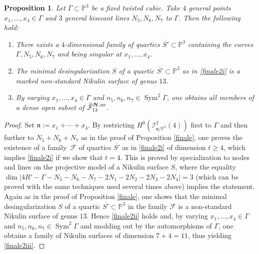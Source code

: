 \documentclass[11pt]{article}
\newcommand{\ns}{{\mkern1mu\mathrm{ns}}}
\newcommand{\bN}{\boldsymbol{N}}
\theoremstyle{plain}
\newtheorem{prop}[thm]{Proposition}
\theoremstyle{definition}
\DeclareMathOperator{\Sym}{Sym}
\newcommand\PP{{\mathbb P}}
\newcommand\F{{\mathcal F}}
\begin{document}
\begin{prop}\label{finale2}
Let $\Gamma\subset \PP^3$ be a fixed twisted cubic. Take $4$ general points $x_1,\ldots,x_4\in \Gamma$ and $3$ general bisecant lines $N_5,N_6,N_7$ to $\Gamma$. Then the following hold:
\begin{enumerate}
\item\label{finale2i}
There exists a $4$-dimensional family of quartics $\overline{S'}\subset\mathbb P^3$ containing the curves \linebreak $\Gamma,N_5,N_6,N_7$ and being singular at $x_1,\ldots,x_4$.
\item\label{finale2ii}
The minimal desingularization $S$ of a quartic $\overline{S'}\subset\mathbb P^3$ as in \eqref{finale2i} is a marked non-standard Nikulin surface of genus $13$.
\item\label{finale2iii}
By varying $x_1,\ldots,x_4\in \Gamma$ and $n_5, n_6,n_7\in \Sym^2\Gamma$, one obtains all members of a dense open subset of $\widehat{\F}_{13}^{\bN,\ns}$.
\end{enumerate}
\end{prop}

\begin{proof}
Set $\mathfrak n:=x_1+\cdots+x_4$. By restricting $H^0(\mathcal I^2_{\mathfrak{n}/\PP^3}(4))$ first to $\Gamma$ and then further to $N_5+N_6+N_7$ as in the proof of Proposition \ref{finale}, one proves the existence of a family~$\F$ of quartics $\overline{S'}$ as in \eqref{finale2i} of dimension $t\geq 4$, which implies \eqref{finale2i} if we show that $t=4$. This is proved by specialization to nodes and lines on the projective model of a Nikulin surface $S$, where the equality
$
\dim |4R'-\Gamma-N_5-N_6-N_7-2N_1-2N_2-2N_3-2N_4|=3
$
(which can be proved with the same techniques used several times above) implies the statement.
Again as in the proof of Proposition \ref{finale}, one shows that the minimal desingularization $S$ of a quartic $\overline{S'}\subset\mathbb P^3$ in the family $\F$ is a non-standard Nikulin surface of genus $13$. Hence \eqref{finale2ii} holds and, by varying $x_1,\ldots,x_4\in \Gamma$ and $n_5, n_6,n_7\in \Sym^2\Gamma$ and modding out by the automorphisms of $\Gamma$, one obtains a family of Nikulin surfaces of dimension $7+4= 11$, thus yielding \eqref{finale2iii}.
\end{proof}
\end{document}
